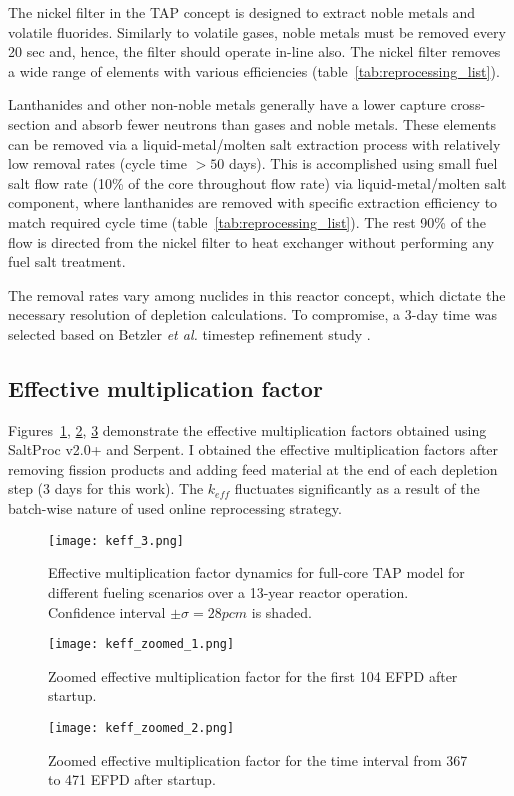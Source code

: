 The nickel filter in the \gls{TAP} concept is designed to extract noble metals 
and volatile fluorides. Similarly to volatile gases, noble metals must be 
removed every 20 sec and, hence, the filter should operate in-line also. The 
nickel filter removes a wide range of elements with various efficiencies 
(table~\ref{tab:reprocessing_list}).

Lanthanides and other non-noble metals generally have a lower capture  
cross-section and absorb fewer neutrons than gases and noble metals. These 
elements can be removed via a liquid-metal/molten salt extraction process with 
relatively low removal rates (cycle time $> 50$ days). This is accomplished 
using small fuel salt flow rate (10\% of the core throughout flow rate) via 
liquid-metal/molten salt component, where lanthanides are removed with 
specific extraction efficiency to match required cycle time  
(table~\ref{tab:reprocessing_list}). The rest 90\% of the flow is directed 
from the nickel filter to heat exchanger without performing any fuel salt 
treatment.

The removal rates vary among nuclides in this reactor concept, which dictate 
the necessary resolution of depletion calculations. To compromise, a 3-day 
time was selected based on Betzler \emph{et al.} timestep refinement study 
\cite{betzler_assessment_2017}.
\subsection{Effective multiplication factor}
Figures~\ref{fig:keff}, \ref{fig:keff-zoomed}, \ref{fig:keff-zoomed-2} 
demonstrate 
the effective 
multiplication factors  obtained using SaltProc v2.0+ and Serpent. I obtained 
the effective multiplication factors after removing fission products 
and adding feed material at the end of each depletion step (3 days for this 
work). The $k_{eff}$ fluctuates significantly as a result of the batch-wise 
nature of used online reprocessing strategy.
\begin{figure}[htp!] %
	\texttt{[image: keff\_3.png]}
	\vspace{-0.2in}
	\caption{Effective multiplication factor dynamics for full-core
		\gls{TAP} model for different fueling scenarios over a 13-year reactor 
		operation. 
		Confidence interval $\pm\sigma=28pcm$ is shaded.}
	\label{fig:keff}
\end{figure}
\begin{figure}[htp!] %
	\centering
	\texttt{[image: keff\_zoomed\_1.png]}
	\caption{Zoomed effective multiplication factor for the first 104 EFPD 
		after startup.}
	\label{fig:keff-zoomed}
\end{figure}
\begin{figure}[htp!] %
	\centering
	\texttt{[image: keff\_zoomed\_2.png]}
	\caption{Zoomed effective multiplication factor for the time interval 
		from 367 to 471 EFPD after startup.}
	\label{fig:keff-zoomed-2}
\end{figure}

